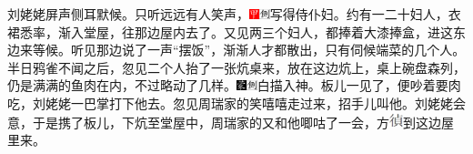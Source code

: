 刘姥姥屏声侧耳默候。只听远远有人笑声，{\includegraphics[width=3mm]{../Images/00002}\includegraphics[width=3mm]{../Images/00011}\footnotesize \kaishu 写得侍仆妇。}约有一二十妇人，衣裙悉率，渐入堂屋，往那边屋内去了。又见两三个妇人，都捧着大漆捧盒，进这东边来等候。听见那边说了一声``摆饭''，渐渐人才都散出，只有伺候端菜的几个人。半日鸦雀不闻之后，忽见二个人抬了一张炕桌来，放在这边炕上，桌上碗盘森列，仍是满满的鱼肉在内，不过略动了几样。{\includegraphics[width=3mm]{../Images/00006}\includegraphics[width=3mm]{../Images/00011}\footnotesize \kaishu 白描入神。}板儿一见了，便吵着要肉吃，刘姥姥一巴掌打下他去。忽见周瑞家的笑嘻嘻走过来，招手儿叫他。刘姥姥会意，于是携了板儿，下炕至堂屋中，周瑞家的又和他唧咕了一会，方\includegraphics[width=4mm]{../images/00015}到这边屋里来。

